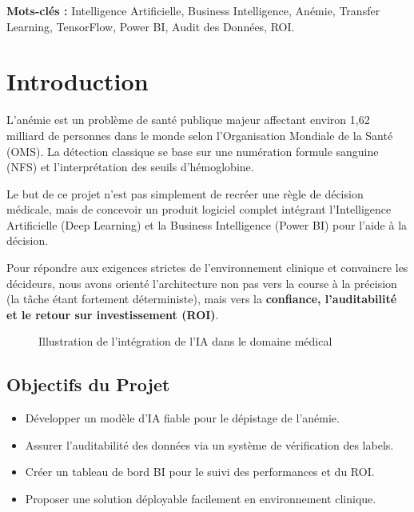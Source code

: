 \documentclass[12pt,a4paper]{article}
\begin{document}
\vspace{0.5cm}
\textbf{Mots-clés :} Intelligence Artificielle, Business Intelligence, Anémie, Transfer Learning, TensorFlow, Power BI, Audit des Données, ROI.

\newpage
\tableofcontents

\newpage
\listoffigures
{}
\listoftables
{}

\newpage

\section{Introduction}
\label{sec:introduction}

L'anémie est un problème de santé publique majeur affectant environ 1,62 milliard de personnes dans le monde selon l'Organisation Mondiale de la Santé (OMS). La détection classique se base sur une numération formule sanguine (NFS) et l'interprétation des seuils d'hémoglobine. 

Le but de ce projet n'est pas simplement de recréer une règle de décision médicale, mais de concevoir un produit logiciel complet intégrant l'Intelligence Artificielle (Deep Learning) et la Business Intelligence (Power BI) pour l'aide à la décision. 

Pour répondre aux exigences strictes de l'environnement clinique et convaincre les décideurs, nous avons orienté l'architecture non pas vers la course à la précision (la tâche étant fortement déterministe), mais vers la \textbf{confiance, l'auditabilité et le retour sur investissement (ROI)}.

\begin{figure}[H]
\centering
{}
\caption{Illustration de l'intégration de l'IA dans le domaine médical}
\label{fig:intro_healthcare}
\end{figure}

\subsection{Objectifs du Projet}
\begin{itemize}[label=\textbullet]
    \item Développer un modèle d'IA fiable pour le dépistage de l'anémie.
    \item Assurer l'auditabilité des données via un système de vérification des labels.
    \item Créer un tableau de bord BI pour le suivi des performances et du ROI.
    \item Proposer une solution déployable facilement en environnement clinique.
\end{itemize}
\end{document}
